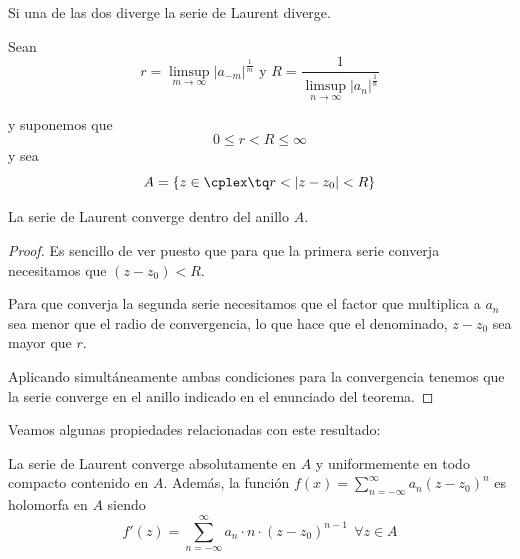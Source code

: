 \documentclass{apuntes}
\begin{document}
\obs Si una de las dos diverge la serie de Laurent diverge.

\begin{theorem}
Sean
\[r = \limsup_{m \to \infty}|a_{-m}|^\frac{1}{m} \text{ y } R = \frac{1}{\limsup_{n \to \infty}|a_{n}|^\frac{1}{n}}\]

y suponemos que
\[0 \leq r < R \leq \infty\]
y sea
\[A = \{z \in \cplex \tq r < |z-z_0|<R\}\]

La serie de Laurent converge dentro del anillo $A$.
\end{theorem}
\begin{proof}
Es sencillo de ver puesto que para que la primera serie converja necesitamos que $(z-z_0)< R$.

Para que converja la segunda serie necesitamos que el factor que multiplica a $a_n$ sea menor que el radio de convergencia, lo que hace que el denominado, $z-z_0$ sea mayor que $r$.

Aplicando simultáneamente ambas condiciones para la convergencia tenemos que la serie converge en el anillo indicado en el enunciado del teorema.
\end{proof}

Veamos algunas propiedades relacionadas con este resultado:
\begin{prop}

La serie de Laurent converge absolutamente en $A$ y uniformemente en todo compacto contenido en $A$. Además, la función $f(x)=\sum_{n=-\infty}^{\infty}a_n(z-z_0)^n$ es holomorfa en $A$ siendo
\[f'(z)=\sum_{n=-\infty}^{\infty}a_n\cdot n \cdot (z-z_0)^{n-1} \ \ \forall z \in A\]
\end{prop}
\end{document}
